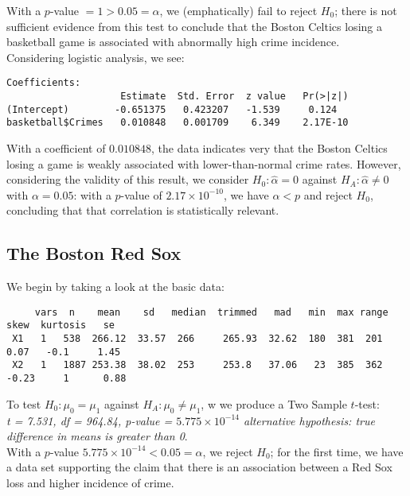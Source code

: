 \documentclass{article}
\begin{document}
With a $p$-value $= 1 > 0.05 = \alpha$, we (emphatically) fail to reject $H_0$; there is not sufficient evidence from this test to conclude that the Boston Celtics losing a basketball game is associated with abnormally high crime incidence. \\

Considering logistic analysis, we see: 

\begin{verbatim}
Coefficients:
                    Estimate  Std. Error  z value   Pr(>|z|)
(Intercept)        -0.651375   0.423207   -1.539     0.124
basketball$Crimes   0.010848   0.001709    6.349    2.17E-10
\end{verbatim}


With a coefficient of $0.010848$, the data indicates very  that the Boston Celtics losing a game is weakly associated with lower-than-normal crime rates. However, considering the validity of this result, we consider $H_0: \hat{\alpha} = 0$ against $H_A: \hat{\alpha} \neq 0$ with $\alpha = 0.05$: with a $p$-value of $2.17\times10^{-10}$, we have $\alpha < p$ and reject $H_0$, concluding that that correlation is statistically relevant. 

\subsection{The Boston Red Sox}
We begin by taking a look at the basic data: 

\begin{verbatim}
     vars  n    mean    sd   median  trimmed   mad   min  max range  skew  kurtosis   se
 X1   1   538  266.12  33.57  266     265.93  32.62  180  381  201   0.07   -0.1     1.45  
 X2   1   1887 253.38  38.02  253     253.8   37.06   23  385  362  -0.23     1      0.88
\end{verbatim}

To test $H_0: \mu_0 = \mu_1$ against $H_A: \mu_0 \neq \mu_1$, w we produce a Two Sample $t$-test:\\

\textit{
t = 7.531, df = 964.84, p-value = $5.775\times10^{-14}$
alternative hypothesis: true difference in means is greater than 0}. \\

With a $p$-value $5.775\times10^{-14} < 0.05 = \alpha$, we reject $H_0$; for the first time, we have a data set supporting the claim that there is an association between a Red Sox loss and higher incidence of crime. \\
\end{document}
